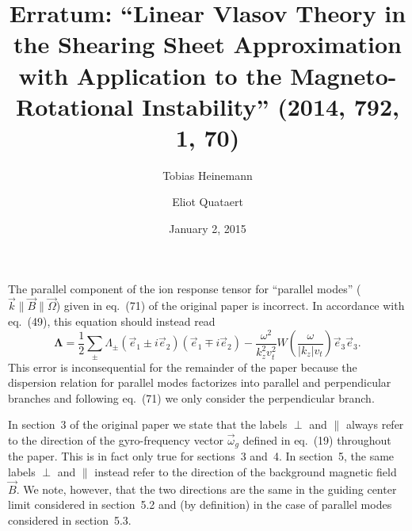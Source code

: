 \documentclass[aps,pre,notitlepage,amsmath,amssymb,amsfonts,nobibnotes,nofootinbib,superscriptaddress]{revtex4-1}
\begin{document}
\title{Erratum: ``Linear Vlasov Theory in the Shearing Sheet Approximation \\
  with Application to the Magneto-Rotational Instability'' (2014, 792, 1, 70)}

\author{Tobias Heinemann}
\author{Eliot Quataert}

\date{January 2, 2015}

\maketitle

The parallel component of the ion response tensor for ``parallel modes''
($\vec{k}\parallel\vec{B}\parallel\vec{\Omega}$) given in eq.~(71) of the
original paper is incorrect. In accordance with eq.~(49), this equation should
instead read
\begin{equation}
  \mathbf{\Lambda} =
  \frac{1}{2}\sum_\pm\Lambda^{}_\pm
  (\vec{e}_1\pm i\vec{e}_2)(\vec{e}_1\mp i\vec{e}_2)
  - \frac{\omega^2}{k_z^2 v_t^2} W\left(\frac{\omega}{|k_z|v_t}\right)
  \vec{e}_3\vec{e}_3.
\end{equation}
This error is inconsequential for the remainder of the paper because the
dispersion relation for parallel modes factorizes into parallel and
perpendicular branches and following eq.~(71) we only consider the
perpendicular branch.

In section~3 of the original paper we state that the labels $\perp$ and
$\parallel$ always refer to the direction of the gyro-frequency vector
$\vec{\omega}_g$ defined in eq.~(19) throughout the paper. This is in fact
only true for sections~3 and~4. In section~5, the same labels $\perp$ and
$\parallel$ instead refer to the direction of the background magnetic field
$\vec{B}$. We note, however, that the two directions are the same in the
guiding center limit considered in section~5.2 and (by definition) in the case
of parallel modes considered in section~5.3.
\end{document}
